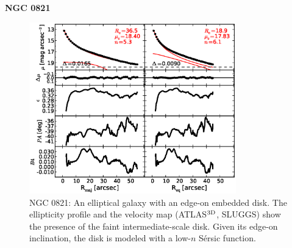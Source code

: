 \documentclass[preprint2]{emulateapj}
\newcommand{\fitfigurewidth}{0.8\textwidth}
\begin{document}
  \clearpage\newpage\noindent

  {\bf NGC 0821 \\}

  \begin{figure}[h]
  \begin{center}
  \includegraphics[width=\fitfigurewidth]{n0821_1Dfit.eps}
  \caption{NGC 0821: 
  An elliptical galaxy with an edge-on embedded disk. 
  The ellipticity profile and the velocity map (ATLAS$^{\rm 3D}$, SLUGGS) show the presence of the faint intermediate-scale disk. 
  Given its edge-on inclination, the disk is modeled with a low-$n$ S\'ersic function.   
  }
  \end{center}
  \end{figure}
  
\end{document}
